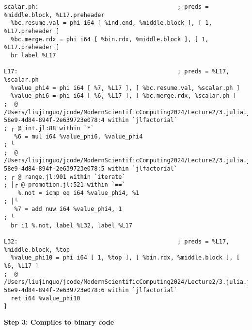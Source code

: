 \documentclass[
  notoc %
]{tufte-book}
\begin{document}
\begin{lstlisting}
scalar.ph:                                        ; preds = %middle.block, %L17.preheader
  %bc.resume.val = phi i64 [ %ind.end, %middle.block ], [ 1, %L17.preheader ]
  %bc.merge.rdx = phi i64 [ %bin.rdx, %middle.block ], [ 1, %L17.preheader ]
  br label %L17

L17:                                              ; preds = %L17, %scalar.ph
  %value_phi4 = phi i64 [ %7, %L17 ], [ %bc.resume.val, %scalar.ph ]
  %value_phi6 = phi i64 [ %6, %L17 ], [ %bc.merge.rdx, %scalar.ph ]
;  @ /Users/liujinguo/jcode/ModernScientificComputing2024/Lecture2/3.julia.jl#==#d2429055-58e9-4d84-894f-2e639723e078:4 within `jlfactorial`
; ┌ @ int.jl:88 within `*`
   %6 = mul i64 %value_phi6, %value_phi4
; └
;  @ /Users/liujinguo/jcode/ModernScientificComputing2024/Lecture2/3.julia.jl#==#d2429055-58e9-4d84-894f-2e639723e078:5 within `jlfactorial`
; ┌ @ range.jl:901 within `iterate`
; │┌ @ promotion.jl:521 within `==`
    %.not = icmp eq i64 %value_phi4, %1
; │└
   %7 = add nuw i64 %value_phi4, 1
; └
  br i1 %.not, label %L32, label %L17

L32:                                              ; preds = %L17, %middle.block, %top
  %value_phi10 = phi i64 [ 1, %top ], [ %bin.rdx, %middle.block ], [ %6, %L17 ]
;  @ /Users/liujinguo/jcode/ModernScientificComputing2024/Lecture2/3.julia.jl#==#d2429055-58e9-4d84-894f-2e639723e078:6 within `jlfactorial`
  ret i64 %value_phi10
}
\end{lstlisting}

\textbf{Step 3: Compiles to binary code}
\end{document}
